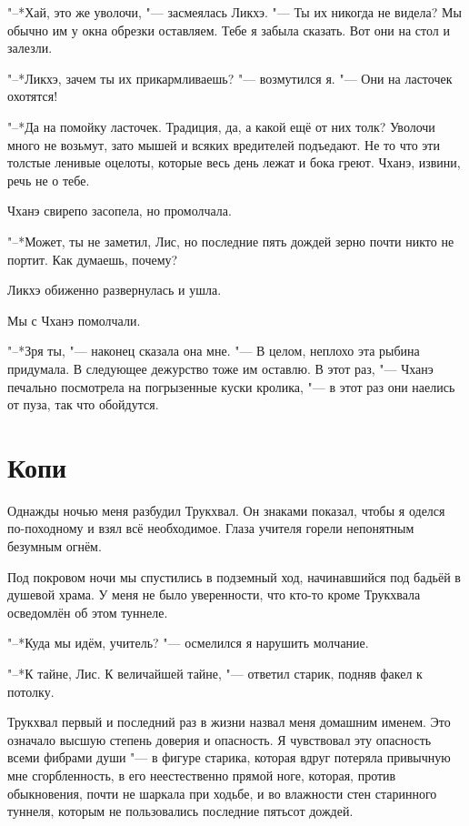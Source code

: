 \documentclass[a4paper,10pt]{book}
\newcommand{\ldotst}{\so{...}\xspace}
\begin{document}
"--*Хай, это же уволочи, "--- засмеялась Ликхэ. "--- Ты их никогда не видела? 
Мы обычно им у окна обрезки оставляем. Тебе я забыла сказать. Вот они на стол и 
залезли.

"--*Ликхэ, зачем ты их прикармливаешь? "--- возмутился я. "--- Они на ласточек 
охотятся!

"--*Да на помойку ласточек. Традиция, да, а какой ещё от них толк? Уволочи 
много не возьмут, зато мышей и всяких вредителей подъедают. Не то что эти 
толстые ленивые оцелоты, которые весь день лежат и бока греют. Чханэ, извини, 
речь не о тебе.

Чханэ свирепо засопела, но промолчала.

"--*Может, ты не заметил, Лис, но последние пять дождей зерно почти никто не 
портит. Как думаешь, почему?

Ликхэ обиженно развернулась и ушла.

Мы с Чханэ помолчали.

"--*Зря ты, "--- наконец сказала она мне. "--- В целом, неплохо эта рыбина 
придумала. В следующее дежурство тоже им оставлю. В этот раз, "--- Чханэ 
печально посмотрела на погрызенные куски кролика, "--- в этот раз они наелись 
от пуза, так что обойдутся.
 
\section{Копи}
 
Однажды ночью меня разбудил Трукхвал. Он знаками показал, чтобы я оделся 
по-походному и взял всё необходимое. Глаза учителя горели непонятным безумным 
огнём.

Под покровом ночи мы спустились в подземный ход, начинавшийся под бадьёй в 
душевой храма. У меня не было уверенности, что кто-то кроме Трукхвала 
осведомлён об этом туннеле.

"--*Куда мы идём, учитель? "--- осмелился я нарушить молчание.

"--*К тайне, Лис. К величайшей тайне, "--- ответил старик, подняв факел к
потолку.

Трукхвал первый и последний раз в жизни назвал меня домашним именем. Это 
означало высшую степень доверия\ldotst и опасность. Я чувствовал эту опасность 
всеми фибрами души "--- в фигуре старика, которая вдруг потеряла привычную мне 
сгорбленность, в его неестественно прямой ноге, которая, против обыкновения, 
почти не шаркала при ходьбе, и во влажности стен старинного туннеля, которым не 
пользовались последние пятьсот дождей.
\end{document}
